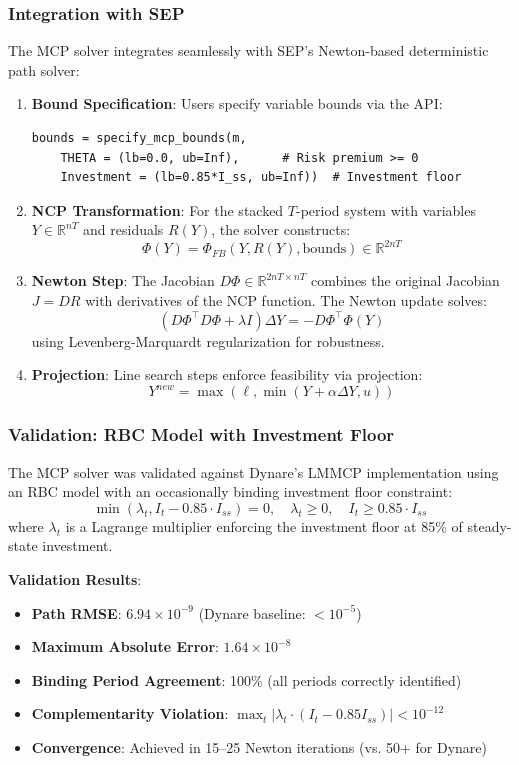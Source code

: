 \documentclass[12pt]{article}
\begin{document}
\subsubsection{Integration with SEP}

The MCP solver integrates seamlessly with SEP's Newton-based deterministic path solver:

\begin{enumerate}
\item \textbf{Bound Specification}: Users specify variable bounds via the API:
\begin{verbatim}
bounds = specify_mcp_bounds(m,
    THETA = (lb=0.0, ub=Inf),      # Risk premium >= 0
    Investment = (lb=0.85*I_ss, ub=Inf))  # Investment floor
\end{verbatim}

\item \textbf{NCP Transformation}: For the stacked $T$-period system with variables $Y \in \mathbb{R}^{nT}$ and residuals $R(Y)$, the solver constructs:
\[
\Phi(Y) = \Phi_{FB}(Y, R(Y), \text{bounds}) \in \mathbb{R}^{2nT}
\]

\item \textbf{Newton Step}: The Jacobian $D\Phi \in \mathbb{R}^{2nT \times nT}$ combines the original Jacobian $J = DR$ with derivatives of the NCP function. The Newton update solves:
\[
(D\Phi^\top D\Phi + \lambda I) \Delta Y = -D\Phi^\top \Phi(Y)
\]
using Levenberg-Marquardt regularization for robustness.

\item \textbf{Projection}: Line search steps enforce feasibility via projection:
\[
Y^{new} = \max(\ell, \min(Y + \alpha \Delta Y, u))
\]
\end{enumerate}

\subsubsection{Validation: RBC Model with Investment Floor}

The MCP solver was validated against Dynare's LMMCP implementation using an RBC model with an occasionally binding investment floor constraint:
\[
\min(\lambda_t, I_t - 0.85 \cdot I_{ss}) = 0, \quad \lambda_t \geq 0, \quad I_t \geq 0.85 \cdot I_{ss}
\]
where $\lambda_t$ is a Lagrange multiplier enforcing the investment floor at 85\% of steady-state investment.

\textbf{Validation Results}:
\begin{itemize}
\item \textbf{Path RMSE}: $6.94 \times 10^{-9}$ (Dynare baseline: $< 10^{-5}$)
\item \textbf{Maximum Absolute Error}: $1.64 \times 10^{-8}$
\item \textbf{Binding Period Agreement}: 100\% (all periods correctly identified)
\item \textbf{Complementarity Violation}: $\max_t |\lambda_t \cdot (I_t - 0.85I_{ss})| < 10^{-12}$
\item \textbf{Convergence}: Achieved in 15--25 Newton iterations (vs. 50+ for Dynare)
\end{itemize}
\end{document}
